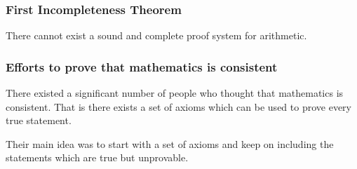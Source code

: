 \documentclass{beamer}
\DeclareMathOperator{\Th}{Th}
\begin{document}
%

\begin{frame}
\frametitle{First Incompleteness Theorem}
\begin{theorem}[1931]
    There cannot exist a sound and complete proof system for
    arithmetic.
\end{theorem}
\end{frame}
\begin{frame}
\frametitle{Efforts to prove that mathematics is consistent}
There existed a significant number of people who thought that mathematics is consistent.
That is there exists a set of axioms which can be used to prove every true statement.

Their main idea was to start with a set of axioms and keep on including the statements which are true but unprovable.
\end{frame}
\end{document}
